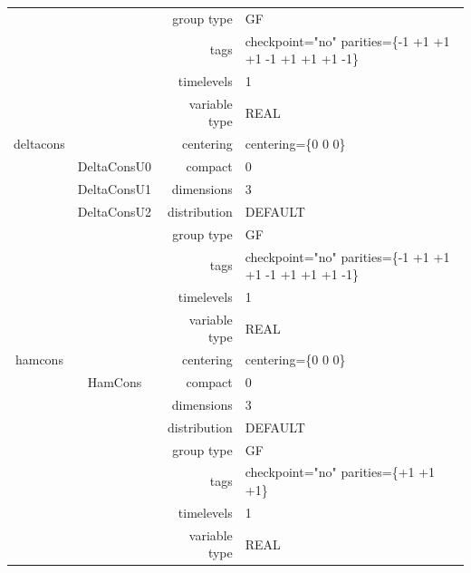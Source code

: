 \begin{tabular*}{150mm}{|c|c@{\extracolsep{\fill}}|rl|}
 &  & group type & GF \\ 
 &  & tags & checkpoint="no" parities=\{-1 +1 +1  +1 -1 +1  +1 +1 -1\} \\ 
 &  & timelevels & 1 \\ 
 &  & variable type & REAL \\ 
\hline 
deltacons &  & centering & centering=\{0 0 0\} \\ 
 & DeltaConsU0 & compact & 0 \\ 
 & DeltaConsU1 & dimensions & 3 \\ 
 & DeltaConsU2 & distribution & DEFAULT \\ 
 &  & group type & GF \\ 
 &  & tags & checkpoint="no" parities=\{-1 +1 +1  +1 -1 +1  +1 +1 -1\} \\ 
 &  & timelevels & 1 \\ 
 &  & variable type & REAL \\ 
\hline 
hamcons &  & centering & centering=\{0 0 0\} \\ 
 & HamCons & compact & 0 \\ 
 &  & dimensions & 3 \\ 
 &  & distribution & DEFAULT \\ 
 &  & group type & GF \\ 
 &  & tags & checkpoint="no" parities=\{+1 +1 +1\} \\ 
 &  & timelevels & 1 \\ 
 &  & variable type & REAL \\ 
\hline 
\end{tabular*} 



\vspace{5mm}
\vspace{5mm}

